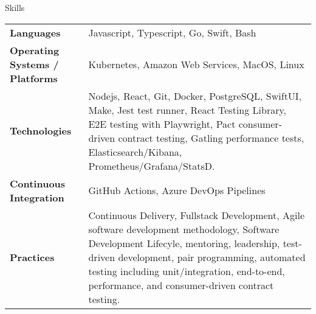 \begin{section}{Skills}
  \begin{tabularx}{\linewidth}{@{}l X@{}}
    \textbf{Languages} &\small{Javascript, Typescript, Go, Swift, Bash} \\
    \textbf{Operating Systems / Platforms} &\small{Kubernetes, Amazon Web Services, MacOS, Linux} \\
    \textbf{Technologies} &\small{Nodejs, React, Git, Docker, PostgreSQL, SwiftUI, Make, Jest test runner, React Testing Library, E2E testing with Playwright, Pact consumer-driven contract testing, Gatling performance tests, Elasticsearch/Kibana, Prometheus/Grafana/StatsD.} \\
    \textbf{Continuous Integration} &\small{GitHub Actions, Azure DevOps Pipelines} \\
    \textbf{Practices} &\small{Continuous Delivery, Fullstack Development, Agile software development methodology, Software Development Lifecyle, mentoring, leadership, test-driven development, pair programming, automated testing including unit/integration, end-to-end, performance, and consumer-driven contract testing.} \\
  \end{tabularx}
\end{section}
